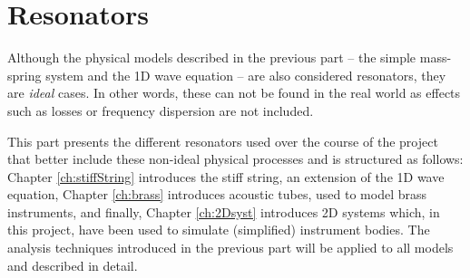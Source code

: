 \chapter*{Resonators}
Although the physical models described in the previous part -- the simple mass-spring system and the 1D wave equation -- are also considered resonators, they are \textit{ideal} cases. In other words, these can not be found in the real world as effects such as losses or frequency dispersion are not included. 

This part presents the different resonators used over the course of the project that better include these non-ideal physical processes and is structured as follows: Chapter \ref{ch:stiffString} introduces the stiff string, an extension of the 1D wave equation, %
Chapter \ref{ch:brass} introduces acoustic tubes, used to model brass instruments, and finally, Chapter \ref{ch:2Dsyst} introduces 2D systems which, in this project, have been used to simulate (simplified) instrument bodies. The analysis techniques introduced in the previous part will be applied to all models and described in detail. 